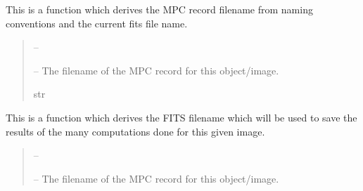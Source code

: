 \documentclass[letterpaper,11pt,english]{sphinxmanual}
\begin{document}
\begin{savenotes}
\begin{fulllineitems}
\begin{savenotes}\begin{fulllineitems}
\label{\detokenize{code/opihiexarata.gui.manual:opihiexarata.gui.manual.OpihiManualWindow.__get_mpc_record_filename}}
\pysigstartsignatures
{}
\pysigstopsignatures
\sphinxAtStartPar
This is a function which derives the MPC record filename from
naming conventions and the current fits file name.
\begin{quote}\begin{description}
\sphinxAtStartPar
{} – 

\sphinxAtStartPar
{} – The filename of the MPC record for this object/image.

\sphinxAtStartPar
str

\end{description}\end{quote}

\end{fulllineitems}\end{savenotes}


\begin{savenotes}\begin{fulllineitems}
\label{\detokenize{code/opihiexarata.gui.manual:opihiexarata.gui.manual.OpihiManualWindow.__get_saving_fits_filename}}
\pysigstartsignatures
{}
\pysigstopsignatures
\sphinxAtStartPar
This is a function which derives the FITS filename which will be
used to save the results of the many computations done for this given
image.
\begin{quote}\begin{description}
\sphinxAtStartPar
{} – 

\sphinxAtStartPar
{} – The filename of the MPC record for this object/image.


\end{description}
\end{quote}
\end{fulllineitems}
\end{savenotes}
\end{fulllineitems}
\end{savenotes}
\end{document}
